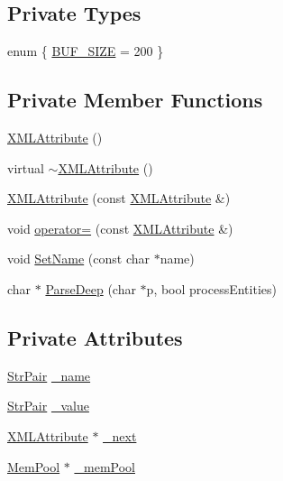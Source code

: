 \subsection*{Private Types}
\begin{DoxyCompactItemize}
\item 
enum \{ \hyperlink{classtinyxml2_1_1_x_m_l_attribute_a1543d5687af193553e0803804c01f377a5c77cc230dc9e6f9011ba6baa5cf6aaa}{B\-U\-F\-\_\-\-S\-I\-Z\-E} = 200
 \}
\end{DoxyCompactItemize}
\subsection*{Private Member Functions}
\begin{DoxyCompactItemize}
\item 
\hyperlink{classtinyxml2_1_1_x_m_l_attribute_ae001da9e4e0f727c44f2aadbfb325a7a}{X\-M\-L\-Attribute} ()
\item 
virtual \hyperlink{classtinyxml2_1_1_x_m_l_attribute_a09f3de63524b73b846af8d8656b90d6c}{$\sim$\-X\-M\-L\-Attribute} ()
\item 
\hyperlink{classtinyxml2_1_1_x_m_l_attribute_a423410d8fb1b94f4514e34abf5432457}{X\-M\-L\-Attribute} (const \hyperlink{classtinyxml2_1_1_x_m_l_attribute}{X\-M\-L\-Attribute} \&)
\item 
void \hyperlink{classtinyxml2_1_1_x_m_l_attribute_a38e1d174a975bab27a70b4032e39a257}{operator=} (const \hyperlink{classtinyxml2_1_1_x_m_l_attribute}{X\-M\-L\-Attribute} \&)
\item 
void \hyperlink{classtinyxml2_1_1_x_m_l_attribute_a469c2363600007f49e62a8048a362d57}{Set\-Name} (const char $\ast$name)
\item 
char $\ast$ \hyperlink{classtinyxml2_1_1_x_m_l_attribute_a3e18cb290baf280fbb1bc90cffd469d3}{Parse\-Deep} (char $\ast$p, bool process\-Entities)
\end{DoxyCompactItemize}
\subsection*{Private Attributes}
\begin{DoxyCompactItemize}
\item 
\hyperlink{classtinyxml2_1_1_str_pair}{Str\-Pair} \hyperlink{classtinyxml2_1_1_x_m_l_attribute_a80850208963b536e9254a7fa1d4abe67}{\-\_\-name}
\item 
\hyperlink{classtinyxml2_1_1_str_pair}{Str\-Pair} \hyperlink{classtinyxml2_1_1_x_m_l_attribute_abcf5c9b7f040ed71ed2a66557584b5b0}{\-\_\-value}
\item 
\hyperlink{classtinyxml2_1_1_x_m_l_attribute}{X\-M\-L\-Attribute} $\ast$ \hyperlink{classtinyxml2_1_1_x_m_l_attribute_a3bbf00f77131a8e83d648d32d090c564}{\-\_\-next}
\item 
\hyperlink{classtinyxml2_1_1_mem_pool}{Mem\-Pool} $\ast$ \hyperlink{classtinyxml2_1_1_x_m_l_attribute_ac0a1130568dd9e985dd7753ae44fcdbf}{\-\_\-mem\-Pool}
\end{DoxyCompactItemize}
